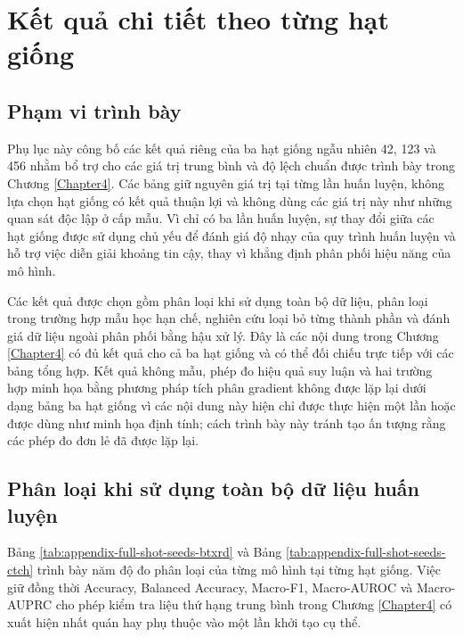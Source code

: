 \chapter{Kết quả chi tiết theo từng hạt giống}
\label{AppendixSeedResults}

\section{Phạm vi trình bày}

Phụ lục này công bố các kết quả riêng của ba hạt giống ngẫu nhiên 42, 123 và 456 nhằm bổ trợ cho các giá trị trung bình và độ lệch chuẩn được trình bày trong Chương \ref{Chapter4}. Các bảng giữ nguyên giá trị tại từng lần huấn luyện, không lựa chọn hạt giống có kết quả thuận lợi và không dùng các giá trị này như những quan sát độc lập ở cấp mẫu. Vì chỉ có ba lần huấn luyện, sự thay đổi giữa các hạt giống được sử dụng chủ yếu để đánh giá độ nhạy của quy trình huấn luyện và hỗ trợ việc diễn giải khoảng tin cậy, thay vì khẳng định phân phối hiệu năng của mô hình.

Các kết quả được chọn gồm phân loại khi sử dụng toàn bộ dữ liệu, phân loại trong trường hợp mẫu học hạn chế, nghiên cứu loại bỏ từng thành phần và đánh giá dữ liệu ngoài phân phối bằng hậu xử lý. Đây là các nội dung trong Chương \ref{Chapter4} có đủ kết quả cho cả ba hạt giống và có thể đối chiếu trực tiếp với các bảng tổng hợp. Kết quả không mẫu, phép đo hiệu quả suy luận và hai trường hợp minh họa bằng phương pháp tích phân gradient không được lặp lại dưới dạng bảng ba hạt giống vì các nội dung này hiện chỉ được thực hiện một lần hoặc được dùng như minh họa định tính; cách trình bày này tránh tạo ấn tượng rằng các phép đo đơn lẻ đã được lặp lại.

\section{Phân loại khi sử dụng toàn bộ dữ liệu huấn luyện}

Bảng \ref{tab:appendix-full-shot-seeds-btxrd} và Bảng \ref{tab:appendix-full-shot-seeds-ctch} trình bày năm độ đo phân loại của từng mô hình tại từng hạt giống. Việc giữ đồng thời Accuracy, Balanced Accuracy, Macro-F1, Macro-AUROC và Macro-AUPRC cho phép kiểm tra liệu thứ hạng trung bình trong Chương \ref{Chapter4} có xuất hiện nhất quán hay phụ thuộc vào một lần khởi tạo cụ thể.



